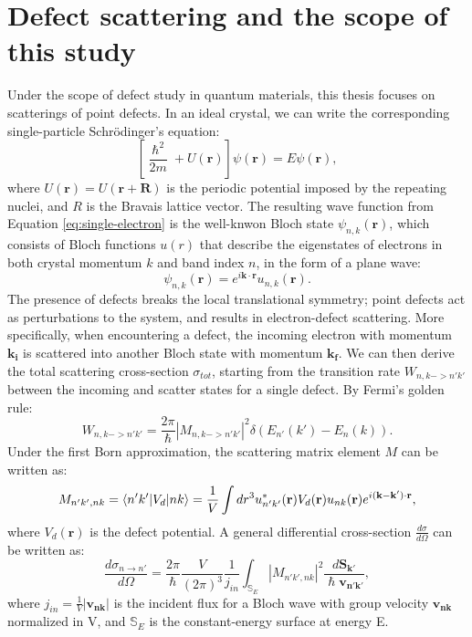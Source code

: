 \section{Defect scattering and the scope of this study}\label{sec:scopeofstudy}
Under the scope of defect study in quantum materials, this thesis focuses on scatterings of point defects. In an ideal crystal, we can write the corresponding single-particle Schr\"{o}dinger's equation: 
\begin{equation}
	\label{eq:single-electron}
	\left[\frac{\hslash^2}{2m}+U(\mathbf{r})\right]\psi(\mathbf{r}) = E\psi(\mathbf{r}),
\end{equation}
where $U(\mathbf{r})=U(\mathbf{r}+\mathbf{R})$ is the periodic potential imposed by the repeating nuclei, and $R$ is the Bravais lattice vector. 
The resulting wave function from Equation \ref{eq:single-electron} is the well-knwon Bloch state $\psi_{n,k}(\mathbf{r})$, which consists of Bloch functions $u(r)$ that describe the eigenstates of electrons in both crystal momentum $k$ and band index $n$, in the form of a plane wave: 
\begin{equation}
	\psi_{n,k}(\mathbf{r}) = e^{i\mathbf{k}\cdot \mathbf{r}}u_{n,k}(\mathbf{r}).
\end{equation}
The presence of defects breaks the local translational symmetry; point defects act as perturbations to the system, and results in electron-defect scattering. More specifically, when encountering a defect, the incoming electron with momentum $\mathbf{k_i}$ is scattered into another Bloch state with momentum $\mathbf{k_f}$. We can then derive the total scattering cross-section $\sigma_{tot}$, starting from the transition rate $W_{n,k->n'k'}$ between the incoming and scatter states for a single defect. By Fermi's golden rule:
\begin{equation}
	W_{n,k->n'k'} = \frac{2\pi}{\hslash}|M_{n,k->n'k'}|^2\delta(E_{n'}(k')-E_{n}(k)). 
\end{equation}
Under the first Born approximation, the scattering matrix element $M$ can be written as:  
\begin{equation}
	M_{n'k',nk} = \braket{n'k'|V_d|nk} = \frac{1}{V}\int dr^3 \space u_{n'k'}^{*}(\mathbf{r}) V_d(\mathbf{r}) u_{nk}(\mathbf{r})e^{i(\mathbf{k}-\mathbf{k'})\cdot \mathbf{r}},
\end{equation} 
where $V_d(\mathbf{r})$ is the defect potential. A general differential cross-section $\frac{d\sigma}{d\Omega}$ can be written as: 
\begin{equation}
	\label{eq:differential_cross_section}
	\frac{d\sigma_{n\rightarrow n'}}{d\Omega} = \frac{2\pi}{\hslash} \frac{V}{(2\pi)^3}\frac{1}{j_{in}}\int_{\mathbb{S}_E}|M_{n'k',nk}|^2\frac{d\mathbf{S_{k'}}}{\hslash \mathbf{v_{n'k'}}},
\end{equation}
where $j_{in} = \frac{1}{V}|\mathbf{v_{nk}}|$ is the incident flux for a Bloch wave with group velocity $\mathbf{v_{nk}}$ normalized in V, and $\mathbb{S}_E$ is the constant-energy surface at energy E. 

